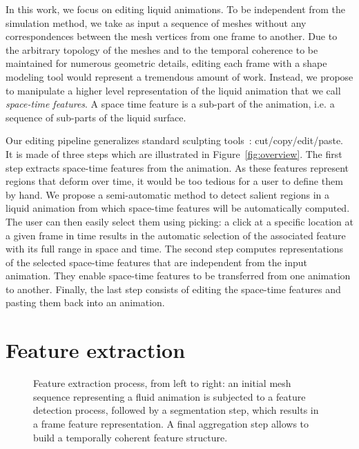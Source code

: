 \documentclass[review]{acmsiggraph}
\begin{document}
In this work, we focus on editing liquid animations.
To be independent from the simulation method, we take as input a sequence of meshes without any correspondences between the mesh vertices from one frame to another. 
Due to the arbitrary topology of the meshes and to the temporal coherence to be maintained for numerous geometric details, editing each frame with a shape modeling tool would represent a tremendous amount of work.
Instead, we propose to manipulate a higher level representation of the liquid animation that we call \emph{space-time features}. A space time feature is a sub-part of the animation, i.e. a sequence of sub-parts of the liquid surface. 

Our editing pipeline generalizes standard sculpting tools~\cite{Ferley2000}: cut/copy/edit/paste.
It is made of three steps which are illustrated in Figure~\ref{fig:overview}. 
The first step extracts space-time features from the animation. As these features represent regions that deform over time, it would be too tedious for a user to define them by hand. We propose a semi-automatic method to detect salient regions in a liquid animation from which space-time features will be automatically computed. 
The user can then easily select them using picking: a click at a specific location at a given frame in time results in the automatic selection of the associated feature with its full range in space and time.
The second step computes representations of the selected space-time features that are independent from the input animation.
They enable space-time features to be transferred from one animation to another. 
Finally, the last step consists of editing the space-time features and pasting them back into an animation.


\section{Feature extraction}
\label{sec:extraction}
 
 \begin{figure}
\centering
\resizebox{1.00\linewidth}{!}{}
 \caption{Feature extraction process, from left to right: an initial mesh sequence representing a fluid animation is subjected to a feature detection process, followed by a segmentation step, which results in a frame feature representation. 
A final aggregation step allows to build a temporally coherent feature structure.}
 \label{fig:feature_extraction}
\end{figure}
\end{document}

